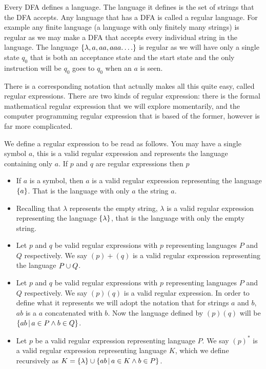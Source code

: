 \documentclass{article}
\begin{document}
	Every DFA defines a language. The language it defines is the set of strings that the DFA accepts. Any language that has a DFA is called a regular language. For example any finite language (a language with only finitely many strings) is regular as we may make a DFA that accepts every individual string in the language. The language $\left\{ {\lambda, a, aa, aaa. \ldots} \right\}$ is regular as we will have only a single state $q_0$ that is both an acceptance state and the start state and the only instruction will be $q_0$ goes to $q_0$ when an $a$ is seen.
	
	There is a corresponding notation that actually makes all this quite easy, called regular expressions. There are two kinds of regular expression: there is the formal mathematical regular expression that we will explore momentarily, and the computer programming regular expression that is based of the former, however is far more complicated.
	
	We define a regular expression to be read as follows. You may have a single symbol $a$, this is a valid regular expression and represents the language containing only $a$. If $p$ and $q$ are regular expressions then $p$
	
	\begin{itemize}
	\item If $a$ is a symbol, then $a$ is a valid regular expression representing the language $\left\{ {a} \right\}$. That is the language with only $a$ the string $a$.
	\item Recalling that $\lambda$ represents the empty string, $\lambda$ is a valid regular expression representing the language $\left\{ {\lambda} \right\}$, that is the language with only the empty string.
	\item Let $p$ and $q$ be valid regular expressions with $p$ representing languages $P$ and $Q$ respectively. We say $(p)+(q)$ is a valid regular expression representing the language $P\cup Q$.
	\item Let $p$ and $q$ be valid regular expressions with $p$ representing languages $P$ and $Q$ respectively. We say $(p)(q)$ is a valid regular expression. In order to define what it represents we will adopt the notation that for strings $a$ and $b$, $ab$ is a $a$ concatenated with $b$. Now the language defined by $(p)(q)$ will be $\left\{{ab} \,\middle|\, {a \in P \land b \in Q}\right\}$.
	\item Let $p$ be a valid regular expression representing language $P$. We say $(p)^*$ is a valid regular expression representing language $K$, which we define recursively as $K = \left\{ {\lambda} \right\} \cup \left\{{ab} \,\middle|\, {a\in K\land b\in P}\right\}$.
	\end{itemize}
	
\end{document}
